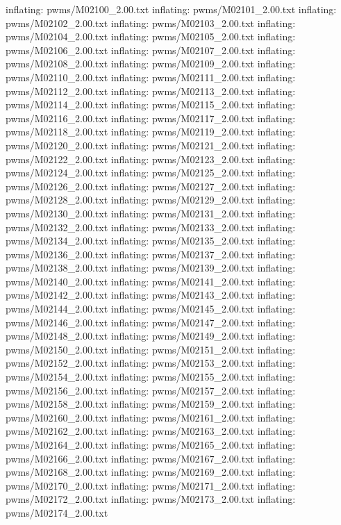 \documentclass[letterpaper,10pt,english]{sphinxmanual}
\begin{document}
{\begin{sphinxVerbatim}[commandchars=\\\{\}]
  inflating: pwms/M02100\_2.00.txt
  inflating: pwms/M02101\_2.00.txt
  inflating: pwms/M02102\_2.00.txt
  inflating: pwms/M02103\_2.00.txt
  inflating: pwms/M02104\_2.00.txt
  inflating: pwms/M02105\_2.00.txt
  inflating: pwms/M02106\_2.00.txt
  inflating: pwms/M02107\_2.00.txt
  inflating: pwms/M02108\_2.00.txt
  inflating: pwms/M02109\_2.00.txt
  inflating: pwms/M02110\_2.00.txt
  inflating: pwms/M02111\_2.00.txt
  inflating: pwms/M02112\_2.00.txt
  inflating: pwms/M02113\_2.00.txt
  inflating: pwms/M02114\_2.00.txt
  inflating: pwms/M02115\_2.00.txt
  inflating: pwms/M02116\_2.00.txt
  inflating: pwms/M02117\_2.00.txt
  inflating: pwms/M02118\_2.00.txt
  inflating: pwms/M02119\_2.00.txt
  inflating: pwms/M02120\_2.00.txt
  inflating: pwms/M02121\_2.00.txt
  inflating: pwms/M02122\_2.00.txt
  inflating: pwms/M02123\_2.00.txt
  inflating: pwms/M02124\_2.00.txt
  inflating: pwms/M02125\_2.00.txt
  inflating: pwms/M02126\_2.00.txt
  inflating: pwms/M02127\_2.00.txt
  inflating: pwms/M02128\_2.00.txt
  inflating: pwms/M02129\_2.00.txt
  inflating: pwms/M02130\_2.00.txt
  inflating: pwms/M02131\_2.00.txt
  inflating: pwms/M02132\_2.00.txt
  inflating: pwms/M02133\_2.00.txt
  inflating: pwms/M02134\_2.00.txt
  inflating: pwms/M02135\_2.00.txt
  inflating: pwms/M02136\_2.00.txt
  inflating: pwms/M02137\_2.00.txt
  inflating: pwms/M02138\_2.00.txt
  inflating: pwms/M02139\_2.00.txt
  inflating: pwms/M02140\_2.00.txt
  inflating: pwms/M02141\_2.00.txt
  inflating: pwms/M02142\_2.00.txt
  inflating: pwms/M02143\_2.00.txt
  inflating: pwms/M02144\_2.00.txt
  inflating: pwms/M02145\_2.00.txt
  inflating: pwms/M02146\_2.00.txt
  inflating: pwms/M02147\_2.00.txt
  inflating: pwms/M02148\_2.00.txt
  inflating: pwms/M02149\_2.00.txt
  inflating: pwms/M02150\_2.00.txt
  inflating: pwms/M02151\_2.00.txt
  inflating: pwms/M02152\_2.00.txt
  inflating: pwms/M02153\_2.00.txt
  inflating: pwms/M02154\_2.00.txt
  inflating: pwms/M02155\_2.00.txt
  inflating: pwms/M02156\_2.00.txt
  inflating: pwms/M02157\_2.00.txt
  inflating: pwms/M02158\_2.00.txt
  inflating: pwms/M02159\_2.00.txt
  inflating: pwms/M02160\_2.00.txt
  inflating: pwms/M02161\_2.00.txt
  inflating: pwms/M02162\_2.00.txt
  inflating: pwms/M02163\_2.00.txt
  inflating: pwms/M02164\_2.00.txt
  inflating: pwms/M02165\_2.00.txt
  inflating: pwms/M02166\_2.00.txt
  inflating: pwms/M02167\_2.00.txt
  inflating: pwms/M02168\_2.00.txt
  inflating: pwms/M02169\_2.00.txt
  inflating: pwms/M02170\_2.00.txt
  inflating: pwms/M02171\_2.00.txt
  inflating: pwms/M02172\_2.00.txt
  inflating: pwms/M02173\_2.00.txt
  inflating: pwms/M02174\_2.00.txt

\end{sphinxVerbatim}}
\end{document}
